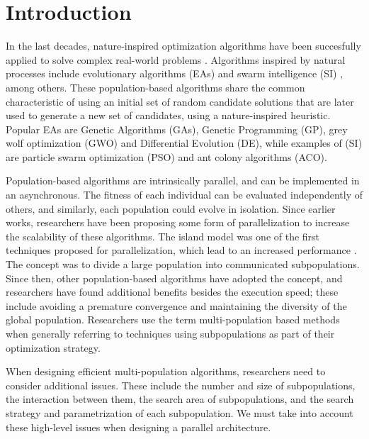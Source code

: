 \documentclass[review]{elsarticle}
\begin{document}
\linenumbers

\section{Introduction}

In the last decades, nature-inspired optimization algorithms have been succesfully
applied to solve complex real-world problems \cite{yang2014nature}. Algorithms
inspired by natural processes include evolutionary algorithms (EAs)
\cite{back1996evolutionary} and swarm intelligence (SI) \cite{kennedy2006swarm},
among others. These population-based algorithms share the common characteristic
of using an initial set of random candidate solutions that are later used to
generate a new set of candidates, using a nature-inspired heuristic. Popular EAs
are Genetic Algorithms (GAs), Genetic Programming (GP), grey wolf optimization
(GWO) and Differential Evolution (DE), while examples of (SI) are particle swarm
optimization (PSO) and ant colony algorithms (ACO).

Population-based algorithms are intrinsically parallel, and can be implemented in an asynchronous. %
The fitness of each individual can be evaluated independently of
others, and similarly, each population could evolve in isolation. Since 
earlier works, researchers have been proposing some form of parallelization
\cite{muhlenbein1988evolution} to increase the scalability of these algorithms.
The island model was one of the first techniques proposed for parallelization,
which lead to an increased performance \cite{gorges1990explicit,grosso1985computer}. 
The concept was to divide a large population into communicated subpopulations. 
Since then, other population-based algorithms have adopted the concept, 
and researchers have found additional benefits
besides the execution speed; these include avoiding a premature convergence and
maintaining the diversity of the global population. Researchers use the term
multi-population based methods when generally referring to techniques using
subpopulations as part of their optimization strategy. %

When designing efficient multi-population algorithms, researchers need to
consider additional issues. These include the number and size of subpopulations,
the interaction between them, the search area of subpopulations, and the search
strategy and parametrization of each subpopulation. We must take into account
these high-level issues when designing a parallel architecture. 
\end{document}
